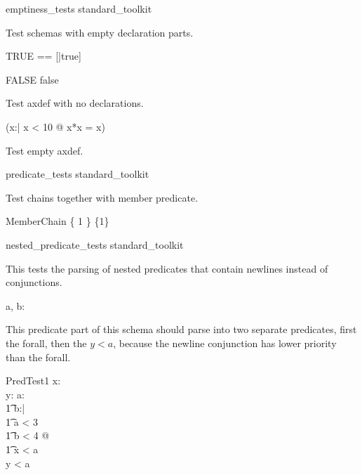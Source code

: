 \documentclass{article}
\begin{document}
\begin{zsection}
\SECTION emptiness\_tests \parents standard\_toolkit
\end{zsection}

Test schemas with empty declaration parts.

\begin{zed}
  TRUE == [|true]
\end{zed}

\begin{schema}{FALSE}
\where
  false
\end{schema}


Test axdef with no declarations.

\begin{axdef}
\where
   (\exists x:\nat | x < 10 @ x*x = x)
\end{axdef}


Test empty axdef.

\begin{axdef}
\end{axdef}



\begin{zsection}
\SECTION predicate\_tests \parents standard\_toolkit
\end{zsection}

Test chains together with member predicate.

\begin{schema}{MemberChain}
 \in \{ 1 \} \in \power \{1\}
\end{schema}



\begin{zsection}
\SECTION nested\_predicate\_tests \parents standard\_toolkit
\end{zsection}

This tests the parsing of nested predicates that contain newlines
instead of conjunctions.

\begin{axdef}
  a, b:\nat
\end{axdef}

This predicate part of this schema should parse into
two separate predicates, first the forall, then the $y<a$,
because the newline conjunction has lower priority than the forall.
\begin{schema}{PredTest1}
   x:\nat \\
   y:\nat
\where
   \forall a:\nat \\
   \t1     b:\nat | \\
   \t1     a < 3 \\
   \t1     b < 4 @ \\
   \t1   x < a \\
   y < a
\end{schema}
\end{document}
